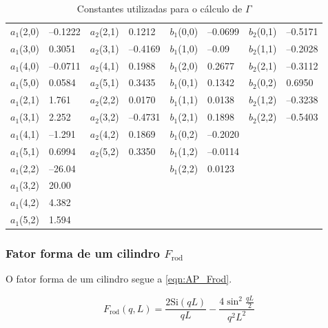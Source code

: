 \begin{apendicesenv}
\begin{table}[h]
    \IBGEtab%
    {\caption{Constantes utilizadas para o cálculo de \(\Gamma\)}
    \label{tab_ap:AiBi}}%
    {\begin{tabular}{r l | r l | r l | r l}
    	\toprule
    	\(a_1\)(2,0) & --0.1222 & \(a_2\)(2,1) & 0.1212   & \(b_1\)(0,0) & --0.0699 & \(b_2\)(0,1) & --0.5171 \\
    	\(a_1\)(3,0) & 0.3051   & \(a_2\)(3,1) & --0.4169 & \(b_1\)(1,0) & --0.09   & \(b_2\)(1,1) & --0.2028 \\
    	\(a_1\)(4,0) & --0.0711 & \(a_2\)(4,1) & 0.1988   & \(b_1\)(2,0) & 0.2677   & \(b_2\)(2,1) & --0.3112 \\
    	\(a_1\)(5,0) & 0.0584   & \(a_2\)(5,1) & 0.3435   & \(b_1\)(0,1) & 0.1342   & \(b_2\)(0,2) & 0.6950   \\
    	\(a_1\)(2,1) & 1.761    & \(a_2\)(2,2) & 0.0170   & \(b_1\)(1,1) & 0.0138   & \(b_2\)(1,2) & --0.3238 \\
    	\(a_1\)(3,1) & 2.252    & \(a_2\)(3,2) & --0.4731 & \(b_1\)(2,1) & 0.1898   & \(b_2\)(2,2) & --0.5403 \\
    	\(a_1\)(4,1) & --1.291  & \(a_2\)(4,2) & 0.1869   & \(b_1\)(0,2) & --0.2020 &            &          \\
    	\(a_1\)(5,1) & 0.6994   & \(a_2\)(5,2) & 0.3350   & \(b_1\)(1,2) & --0.0114 &            &          \\
    	\(a_1\)(2,2) & --26.04  &            &          & \(b_1\)(2,2) & 0.0123   &            &          \\
    	\(a_1\)(3,2) & 20.00    &            &          &            &          &            &          \\
    	\(a_1\)(4,2) & 4.382    &            &          &            &          &            &          \\
    	\(a_1\)(5,2) & 1.594    &            &          &            &          &            &          \\ \bottomrule
    \end{tabular} }%
    {}%
\end{table}

\subsubsection{Fator forma de um cilindro \(F_{\mathrm{rod}}\)}

O fator forma de um cilindro segue a \autoref{eqn:AP_Frod}.

\begin{equation}
F_{\mathrm{rod}}(q, L) = \frac{2\mathrm{Si}(qL)}{qL} - \frac{4\sin^2\frac{qL}{2}}{q^2L^2}
\label{eqn:AP_Frod}
\end{equation}


\end{apendicesenv}
